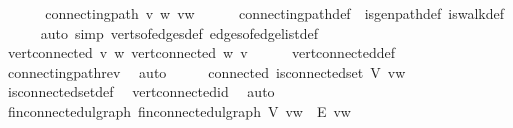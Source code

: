 \begin{isabellebody}
\ \ \isanewline
\ \ \isamarkupfalse%
\ {\isachardoublequoteopen}connecting{\isacharunderscore}{\kern0pt}path\ v\ w\ {\isacharbrackleft}{\kern0pt}v{\isacharcomma}{\kern0pt}w{\isacharbrackright}{\kern0pt}{\isachardoublequoteclose}\isanewline
\ \ \ \ \isamarkupfalse%
\ connecting{\isacharunderscore}{\kern0pt}path{\isacharunderscore}{\kern0pt}def\ \ is{\isacharunderscore}{\kern0pt}gen{\isacharunderscore}{\kern0pt}path{\isacharunderscore}{\kern0pt}def\ is{\isacharunderscore}{\kern0pt}walk{\isacharunderscore}{\kern0pt}def\isanewline
\ \ \ \ \isamarkupfalse%
\ {\isacharparenleft}{\kern0pt}auto\ simp{\isacharcolon}{\kern0pt}\ verts{\isacharunderscore}{\kern0pt}of{\isacharunderscore}{\kern0pt}edges{\isacharunderscore}{\kern0pt}def\ edges{\isacharunderscore}{\kern0pt}of{\isacharunderscore}{\kern0pt}edge{\isacharunderscore}{\kern0pt}list{\isacharunderscore}{\kern0pt}def{\isacharparenright}{\kern0pt}\isanewline
\ \ \isamarkupfalse%
\ \isamarkupfalse%
\ {\isachardoublequoteopen}vert{\isacharunderscore}{\kern0pt}connected\ v\ w{\isachardoublequoteclose}\ {\isachardoublequoteopen}vert{\isacharunderscore}{\kern0pt}connected\ w\ v{\isachardoublequoteclose}\isanewline
\ \ \ \ \isamarkupfalse%
\ vert{\isacharunderscore}{\kern0pt}connected{\isacharunderscore}{\kern0pt}def\ \isamarkupfalse%
\ connecting{\isacharunderscore}{\kern0pt}path{\isacharunderscore}{\kern0pt}rev\ \isamarkupfalse%
\ auto\isanewline
\ \ \isamarkupfalse%
\ \isamarkupfalse%
\ connected{\isacharcolon}{\kern0pt}\ {\isachardoublequoteopen}is{\isacharunderscore}{\kern0pt}connected{\isacharunderscore}{\kern0pt}set\ {\isacharparenleft}{\kern0pt}{\isacharquery}{\kern0pt}V\ {\isacharbrackleft}{\kern0pt}v{\isacharcomma}{\kern0pt}w{\isacharbrackright}{\kern0pt}\ {\isacharbrackleft}{\kern0pt}{\isacharbrackright}{\kern0pt}{\isacharparenright}{\kern0pt}{\isachardoublequoteclose}\isanewline
\ \ \ \ \isamarkupfalse%
\ is{\isacharunderscore}{\kern0pt}connected{\isacharunderscore}{\kern0pt}set{\isacharunderscore}{\kern0pt}def\ \isamarkupfalse%
\ vert{\isacharunderscore}{\kern0pt}connected{\isacharunderscore}{\kern0pt}id\ \isamarkupfalse%
\ auto\isanewline
\ \ \isamarkupfalse%
\ \isamarkupfalse%
\ fin{\isacharunderscore}{\kern0pt}connected{\isacharunderscore}{\kern0pt}ulgraph{\isacharcolon}{\kern0pt}\ {\isachardoublequoteopen}fin{\isacharunderscore}{\kern0pt}connected{\isacharunderscore}{\kern0pt}ulgraph\ {\isacharparenleft}{\kern0pt}{\isacharquery}{\kern0pt}V\ {\isacharbrackleft}{\kern0pt}v{\isacharcomma}{\kern0pt}w{\isacharbrackright}{\kern0pt}\ {\isacharbrackleft}{\kern0pt}{\isacharbrackright}{\kern0pt}{\isacharparenright}{\kern0pt}\ {\isacharparenleft}{\kern0pt}{\isacharquery}{\kern0pt}E\ {\isacharbrackleft}{\kern0pt}v{\isacharcomma}{\kern0pt}w{\isacharbrackright}{\kern0pt}\ {\isacharbrackleft}{\kern0pt}{\isacharbrackright}{\kern0pt}{\isacharparenright}{\kern0pt}{\isachardoublequoteclose}\isanewline

\end{isabellebody}
